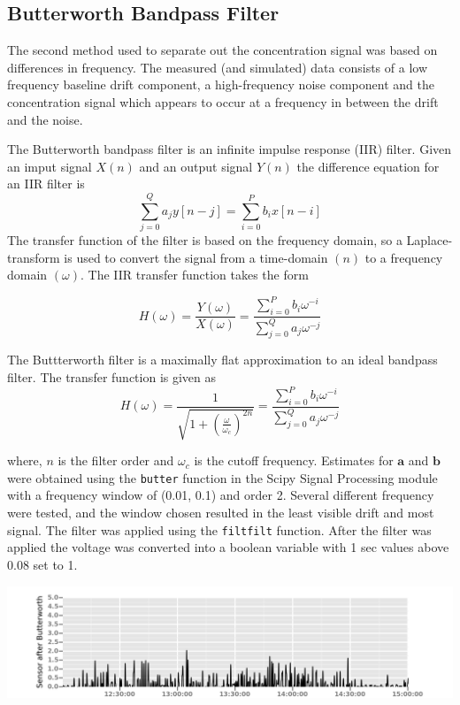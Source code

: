 \documentclass[fontsize=11pt]{scrartcl} %
\begin{document}
\subsection{Butterworth Bandpass Filter} 
The second method used to separate out the concentration signal was based on differences in frequency. The measured (and simulated) data consists of a low frequency baseline drift component, a high-frequency noise component and the concentration signal which appears to occur at a frequency in between the drift and the noise. 

The Butterworth bandpass filter is an infinite impulse response (IIR) filter. Given an imput signal $X(n)$ and an output signal $Y(n)$ the difference equation for an IIR filter is
$$ \sum_{j=0}^Q a_jy[n-j] = \sum_{i=0}^Pb_ix[n-i]$$
The transfer function of the filter is based on the frequency domain, so a Laplace-transform is used to convert the signal from a time-domain $(n)$ to a frequency domain $(\omega)$. The IIR transfer function takes the form

$$ H(\omega) = \frac{Y(\omega)}{X(\omega)} = \frac{\sum_{i=0}^Pb_i\omega^{-i}}{\sum_{j=0}^Qa_j\omega^{-j}}$$

The Buttterworth filter is a maximally flat approximation to an ideal bandpass filter. The transfer function is given as
$$H(\omega) = \frac{1}{\sqrt{1+\left ( \frac{\omega}{\omega_c} \right ) ^{2n}}} = \frac{\sum_{i=0}^Pb_i\omega^{-i}}{\sum_{j=0}^Qa_j\omega^{-j}}$$

where, $n$ is the filter order and $\omega_c$ is the cutoff frequency. Estimates for $\mathbf{a}$ and $\mathbf{b}$ were obtained using the \texttt{butter} function in the Scipy Signal Processing module with a frequency window of (0.01, 0.1) and order 2. Several different frequency were tested, and the window chosen resulted in the least visible drift and most signal. The filter was applied using the \texttt{filtfilt} function.   After the filter was applied the voltage was converted into a boolean variable with 1 sec values above 0.08 set to 1. 
\begin{center}			
	\includegraphics[width=\linewidth]{Butterworth_filt}
\end{center}
\end{document}
